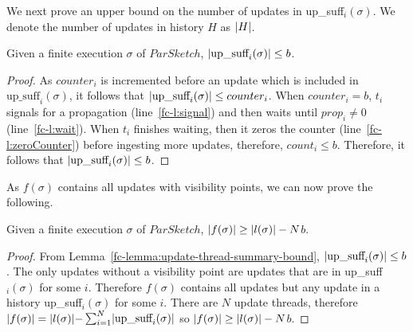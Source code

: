 We next prove an upper bound on the number of updates in up\_suff$_i(\sigma)$. We denote the
number of updates in history $H$ as $\lvert H\rvert$.
\begin{lemma}
    Given a finite execution $\sigma$ of $ParSketch$, $\lvert\text{up\_suff}_i(\sigma)\rvert \leq b$.
    \label{fc-lemma:update-thread-summary-bound}
\end{lemma}
\begin{proof}
    As $counter_i$ is incremented before an update which is included in $\text{up\_suff}_i(\sigma)$,
    it follows that $\lvert\text{up\_suff}_i(\sigma)\rvert \leq counter_i$. When $counter_i = b$, $t_i$
    signals for a propagation (line~\ref{fc-l:signal}) and then waits until $prop_i \neq 0$ (line~\ref{fc-l:wait}).
    When $t_i$ finishes waiting, then it zeros the counter (line~\ref{fc-l:zeroCounter}) before ingesting
    more updates, therefore, $count_i \leq b$. Therefore, it follows that $\lvert\text{up\_suff}_i(\sigma)\rvert \leq b$.
\end{proof}

As $f(\sigma)$ contains all updates with visibility points, we can now prove the following.
\begin{lemma}
    Given a finite execution $\sigma$ of $ParSketch$, $\lvert f(\sigma)\rvert \geq \lvert l(\sigma)\rvert - N$$b$.
    \label{fc-lemma:f-bound}
\end{lemma}
\begin{proof}
    From Lemma~\ref{fc-lemma:update-thread-summary-bound}, $\lvert\text{up\_suff}_i(\sigma)\rvert \leq b$.
    The only updates without a visibility point are updates that are in up\_suff$_i(\sigma)$ for some $i$.
    Therefore $f(\sigma)$ contains all updates but any update in a history up\_suff$_i(\sigma)$ for some $i$.
    There are $N$ update threads, therefore $\lvert f(\sigma)\rvert = \lvert l(\sigma)\rvert - $$\sum_{i=1}^{N} \lvert\text{up\_suff}_i(\sigma)\rvert$
    so $\lvert f(\sigma)\rvert \geq \lvert l(\sigma)\rvert - N $$b$.
\end{proof}

